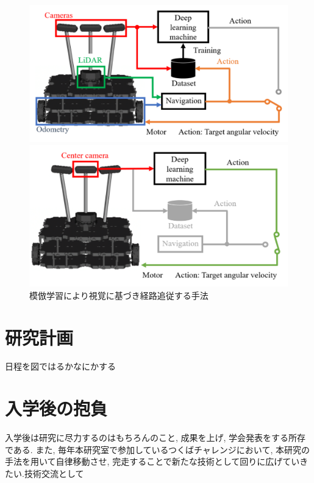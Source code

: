 \documentclass{jsarticle}
\begin{document}
\begin{figure}[htbp]
  \begin{minipage}[t]{0.5\linewidth}
    \centering
    \includegraphics[keepaspectratio, scale=0.32]{fig/lm1.pdf}
  \end{minipage}
  \begin{minipage}[t]{0.5\linewidth}
    \centering
    \includegraphics[keepaspectratio, scale=0.32]{fig/lm2.pdf}
  \end{minipage}\vspace*{2mm}
  \caption{模倣学習により視覚に基づき経路追従する手法}
\end{figure}




\section{研究計画}
日程を図ではるかなにかする


\section{入学後の抱負}
入学後は研究に尽力するのはもちろんのこと, 成果を上げ, 学会発表をする所存である.
また, 毎年本研究室で参加しているつくばチャレンジにおいて, 本研究の手法を用いて自律移動させ, 
完走することで新たな技術として回りに広げていきたい.技術交流として
\end{document}
